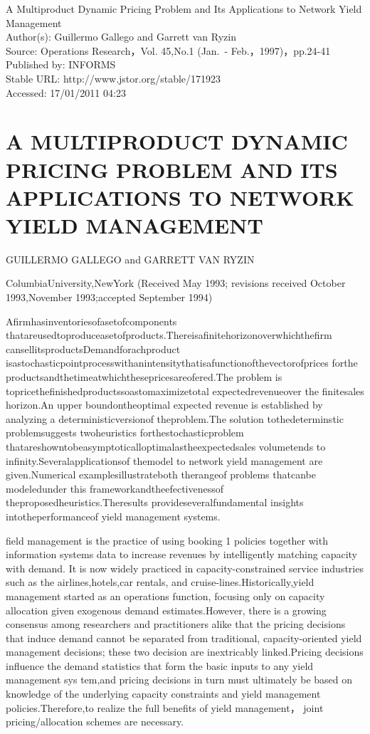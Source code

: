 

A Multiproduct Dynamic Pricing Problem and Its Applications to Network
Yield Management\\
Author(s): Guillermo Gallego and Garrett van Ryzin\\
Source: Operations Research，Vol. 45,No.1 (Jan.~-
Feb.，1997)，pp.24-41\\
Published by: INFORMS\\
Stable URL: http://www.jstor.org/stable/171923\\
Accessed: 17/01/2011 04:23

\section{A MULTIPRODUCT DYNAMIC PRICING PROBLEM AND ITS APPLICATIONS TO
NETWORK YIELD
MANAGEMENT}\label{a-multiproduct-dynamic-pricing-problem-and-its-applications-to-network-yield-management}

GUILLERMO GALLEGO and GARRETT VAN RYZIN

ColumbiaUniversity,NewYork (Received May 1993; revisions received
October 1993,November 1993;accepted September 1994)

Afirmhasinventoriesofasetofcomponents
thatareusedtoproduceasetofproducts.Thereisafinitehorizonoverwhichthefirm
cansellitsproductsDemandforachproduct
isastochasticpointprocesswithanintensitythatisafunctionofthevectorofprices
forthe productsandthetimeatwhichthesepricesareofered.The problem is
topricethefinishedproductssoastomaximizetotal expectedrevenueover the
finitesales horizon.An upper boundontheoptimal expected revenue is
established by analyzing a deterministicversionof theproblem.The
solution tothedeterminstic problemsuggests twoheuristics
forthestochasticproblem
thatareshowntobeasymptoticalloptimalastheexpectedsales volumetends to
infinity.Severalapplicationsof themodel to network yield management are
given.Numerical examplesillustrateboth therangeof problems thatcanbe
modeledunder this frameworkandtheefectivenessof
theproposedheuristics.Theresults provideseveralfundamental insights
intotheperformanceof yield management systems.

field management is the practice of using booking 1 policies together with information systems data to increase revenues by intelligently
matching capacity with demand. It is now widely practiced in capacity-constrained service industries such as the airlines,hotels,car
rentals, and cruise-lines.Historically,yield management started as an
operations function, focusing only on capacity allocation given exogenous demand estimates.However, there is a growing consensus among
researchers and practitioners alike that the pricing decisions that
induce demand cannot be separated from traditional, capacity-oriented
yield management decisions; these two decision are inextricably
linked.Pricing decisions influence the demand statistics that form the
basic inputs to any yield management sys tem,and pricing decisions in
turn must ultimately be based on knowledge of the underlying capacity
constraints and yield management policies.Therefore,to realize the full
benefits of yield management， joint pricing/allocation schemes are
necessary.

